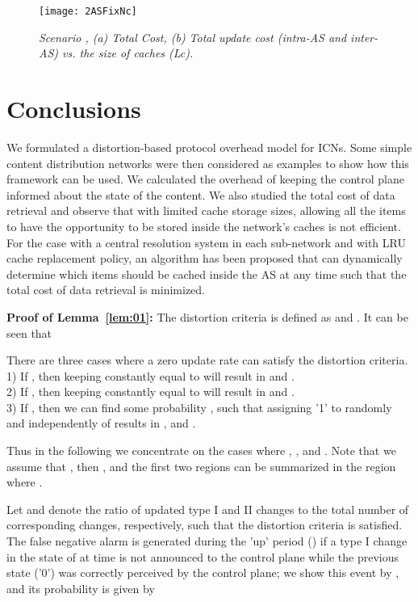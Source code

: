 \documentclass[conference]{IEEEtran}
\theoremstyle{plain}
\theoremstyle{remark}
\begin{document}
\begin{figure}[http]
    \center
      \texttt{[image: 2ASFixNc]}\\
      \caption{\textit{Scenario , (a) Total Cost, (b) Total update cost (intra-AS and inter-AS) vs. the size of caches (Lc).}}
    \label{fig:cost2ASvsLc}
\end{figure}





\section{Conclusions}
\label{sec:conclusion}

We formulated a distortion-based protocol overhead model for ICNs. Some simple content distribution networks were then considered as examples to show how this framework can be used. We calculated the overhead of keeping the control plane informed about the state of the content. We also studied the total cost of data retrieval and observe that with limited cache storage sizes, allowing all the items to have the opportunity to be stored inside the network's caches is not efficient. For the case with a central resolution system in each sub-network and with LRU cache replacement policy, an algorithm has been proposed that can dynamically determine which items should be cached inside the AS at any time such that the total cost of data retrieval is minimized.




\appendix
{\textbf{Proof of Lemma~\ref{lem:01}: }}The distortion criteria is defined as  and . It can be seen that

There are three cases where a zero update rate can satisfy the distortion criteria.\\
 1) If , then keeping  constantly equal to  will result in  and .\\
 2) If , then keeping  constantly equal to  will result in  and .\\
 3) If , then we can find some probability , such that assigning '1' to  randomly  and independently of  results in , and .

Thus in the following we concentrate on the cases where , , and . Note that we assume that , then , and the first two regions can be summarized in the region where .

Let  and   denote the ratio of updated type I and II changes to the total number of corresponding changes, respectively, such that the distortion criteria is satisfied. The false negative alarm is generated during the  'up' period () if a type I change in the state of  at time  is not announced to the control plane while the previous state ('0') was correctly perceived by the control plane; we show this event by , and its probability is given by
\end{document}
